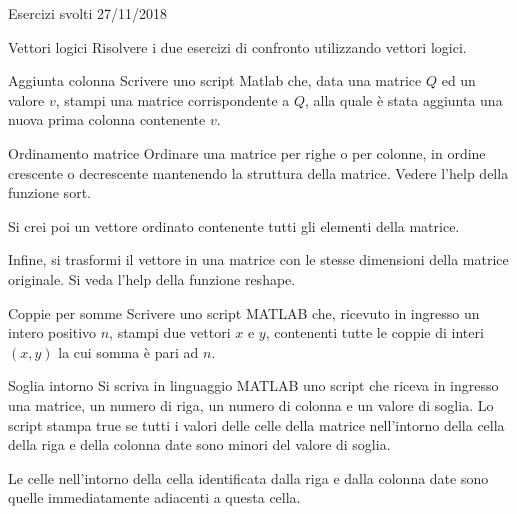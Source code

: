 \documentclass[format=169, handout]{beamer}
\begin{document}
\begin{frame}
\Huge
Esercizi svolti 27/11/2018
\end{frame}

\begin{frame}{Vettori logici}
Risolvere i due esercizi di confronto utilizzando vettori logici.
\end{frame}

\begin{frame}{Aggiunta colonna}
Scrivere uno script Matlab che, data una matrice $Q$ ed un valore $v$, stampi una
matrice corrispondente a $Q$, alla quale è stata aggiunta una nuova prima
colonna contenente $v$.
\end{frame}

\begin{frame}{Ordinamento matrice}
Ordinare una matrice per righe o per colonne, in ordine crescente o decrescente mantenendo la struttura della matrice. Vedere l'help della funzione sort.

Si crei poi un vettore ordinato contenente tutti gli elementi della matrice.

Infine, si trasformi il vettore in una matrice con le stesse dimensioni della matrice originale. Si veda l'help della funzione reshape.
\end{frame}

\begin{frame}{Coppie per somme}
Scrivere uno script MATLAB che, ricevuto in ingresso un intero positivo $n$, stampi due vettori $x$ e $y$, contenenti tutte le coppie di interi $(x,y)$ la cui somma è pari ad $n$.
\end{frame}

\begin{frame}{Soglia intorno}
Si scriva in linguaggio MATLAB uno script che riceva in ingresso una matrice, un numero di riga, un numero di colonna e un valore di soglia. Lo script stampa true se tutti i valori delle celle della matrice nell'intorno della cella della riga e della colonna date sono minori del valore di soglia.

Le celle nell'intorno della cella identificata dalla riga e dalla colonna date sono quelle immediatamente adiacenti a questa cella.
\end{frame}
\end{document}
